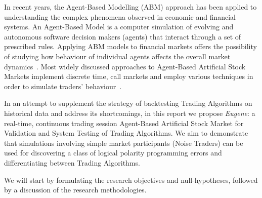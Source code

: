 In recent years, the Agent-Based Modelling (ABM) approach has been applied to understanding the complex phenomena observed in economic and financial systems. An Agent-Based Model is a computer simulation of evolving and autonomous software decision makers (agents) that interact through a set of prescribed rules. Applying ABM models to financial markets offers the possibility of studying how behaviour of individual agents affects the overall market dynamics~\citep{Sorban2008, Farmer2009}. Most widely discussed approaches to Agent-Based Artificial Stock Markets implement discrete time, call markets and employ various techniques in order to simulate traders' behaviour~\cite{Jha2010}.

In an attempt to supplement the strategy of backtesting Trading Algorithms on historical data and address its shortcomings, in this report we propose \emph{Eugene}: a real-time, continuous trading session Agent-Based Artificial Stock Market for Validation and System Testing of Trading Algorithms. We aim to demonstrate that simulations involving simple market participants (Noise Traders) can be used for discovering a class of logical polarity programming errors and differentiating between Trading Algorithms.

We will start by formulating the research objectives and null-hypotheses, followed by a discussion of the research methodologies.





